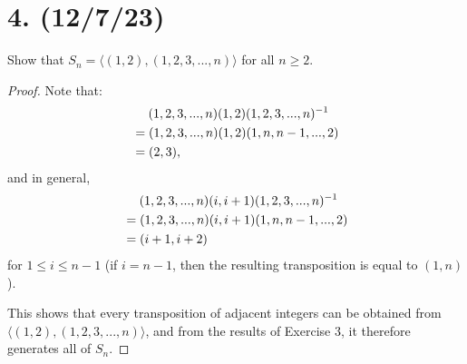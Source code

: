 \documentclass{article}
\begin{document}
\section*{4. (12/7/23)}

Show that $S_n = \langle (1, 2), (1, 2, 3, ..., n) \rangle$ for all $n \geq 2$.

\begin{proof}
    Note that:
    \begin{align*}
        & \hspace{1.3em} (1, 2, 3, ..., n)(1, 2)(1, 2, 3, ..., n)^{-1} \\
        &= (1, 2, 3, ..., n)(1, 2)(1, n, n - 1, ..., 2) \\
        &= (2, 3),
    \end{align*}
    and in general,
    \begin{align*}
        & \hspace{1.3em} (1, 2, 3, ..., n)(i, i + 1)(1, 2, 3, ..., n)^{-1} \\
        &= (1, 2, 3, ..., n)(i, i + 1)(1, n, n - 1, ..., 2) \\
        &= (i + 1, i + 2)
    \end{align*}
    for $1 \leq i \leq n - 1$ (if $i = n - 1$, then the resulting transposition is equal to $(1, n)$).

    This shows that every transposition of adjacent integers can be obtained from $\langle (1, 2), (1, 2, 3, ..., n) \rangle$, and from the results of Exercise 3, it therefore generates all of $S_n$.
\end{proof}
\end{document}
